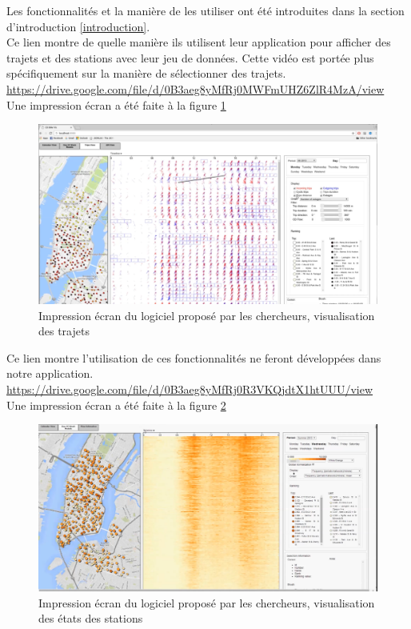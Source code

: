 \documentclass[12pt]{article}
\begin{document}
	Les fonctionnalités et la manière de les utiliser ont été introduites dans la section
	d'introduction \ref{introduction}.\\

	Ce lien montre de quelle manière ils utilisent leur application pour afficher des trajets et
	des stations avec leur jeu de données. Cette vidéo est portée plus spécifiquement sur la manière
	de sélectionner des trajets.\\
	\url{https://drive.google.com/file/d/0B3aeg8yMfRj0MWFmUHZ6ZlR4MzA/view}\\
	Une impression écran a été faite à la figure \ref{fig:trips_screen}\\
	
	\begin{figure}[!h]
	\begin{center}
	\includegraphics[scale=.3]{existant_trips.png}
	\caption{Impression écran du logiciel proposé par les chercheurs, visualisation des trajets}
	\label{fig:trips_screen}
	\end{center}
	\end{figure}
	
	Ce lien montre l'utilisation de ces fonctionnalités ne feront développées dans notre application.\\
	\url{https://drive.google.com/file/d/0B3aeg8yMfRj0R3VKQjdtX1htUUU/view}\\
	Une impression écran a été faite à la figure \ref{fig:station_screen}\\
	
	\begin{figure}[!h]
	\begin{center}
	\includegraphics[scale=.3]{existant_station_state.png}
	\caption{Impression écran du logiciel proposé par les chercheurs, visualisation des états
	des stations}
	\label{fig:station_screen}
	\end{center}
	\end{figure}
	
\end{document}
